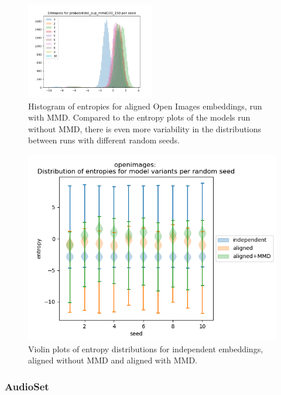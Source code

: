 \begin{figure}[H]

    \centering
    \includegraphics[width=0.5\textwidth]{images/method/probabilistic_aligned/openimages/probabilistic_sup_mmd100_150_entropies.png}
    \caption{
        Histogram of entropies for aligned Open Images embeddings, run with MMD. Compared to the entropy plots of the models run without MMD, there is even more variability in the distributions between runs with different random seeds. 
    }
\end{figure}


\begin{figure}[H]
    \centering
    \includegraphics[width=\textwidth]{images/results/openimages_entropies_violin.png}
    \caption{
        Violin plots of entropy distributions for independent embeddings, aligned without MMD and aligned with MMD. 
    }
\end{figure}

\subsubsection{AudioSet}

